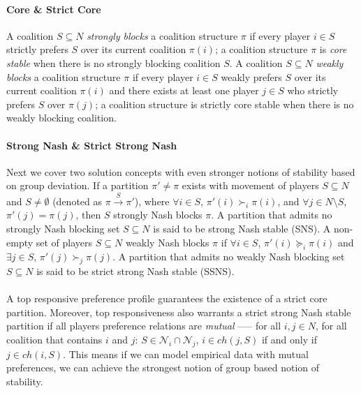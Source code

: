 \paragraph{Core \& Strict Core}
A coalition $S \subseteq N$ \textit{strongly blocks} a coalition structure $\pi$
if every player $i \in S$ strictly prefers $S$ over its current coalition $\pi(i)$;
a coalition structure $\pi$ is \textit{core stable} when there is no strongly
blocking coalition $S$.
A coalition $S \subseteq N$ \textit{weakly blocks} a coalition structure $\pi$
if every player $i \in S$ weakly prefers $S$ over its current coalition $\pi(i)$
and there exists at least one player $j \in S$ who strictly prefers $S$
over $\pi(j)$; a coalition structure is strictly core stable when there is no
weakly blocking coalition.

\paragraph{Strong Nash \& Strict Strong Nash}
Next we cover two solution concepts with even stronger notions of stability
based on group deviation.
If a partition $\pi' \neq \pi$ exists with movement of players $S \subseteq N$
and $S \neq \emptyset$ (denoted as $\pi \xrightarrow{S} \pi'$), where
$\forall i \in S$, $\pi'(i) \succ_i \pi(i)$,
and $\forall j \in N\text{\textbackslash}S$, $\pi'(j) = \pi(j)$,
then $S$ strongly Nash blocks $\pi$.
A partition that admits no strongly Nash blocking set $S \subseteq N$ is said
to be strong Nash stable (SNS).
A non-empty set of players $S \subseteq N$ weakly Nash blocks $\pi$ if
$\forall i \in S$, $\pi'(i) \succeq_i \pi(i)$ and $\exists j \in S$,
$\pi'(j) \succ_j \pi(j)$.
A partition that admits no weakly Nash blocking set $S \subseteq N$ is said to
be strict strong Nash stable (SSNS).

\paragraph{}
A top responsive preference profile guarantees the existence of a strict core partition.
Moreover, top responsiveness also warrants a strict strong Nash stable partition
if all players preference relations are \textit{mutual} ––– for all $i, j \in N$,
for all coalition that contains $i$ and $j$:
$S \in \mathcal{N}_i \cap \mathcal{N}_j$, $i \in ch(j, S)$ if and only if
$j \in ch(i, S)$.
This means if we can model empirical data with mutual preferences,
we can achieve the strongest notion of group based notion of stability.


